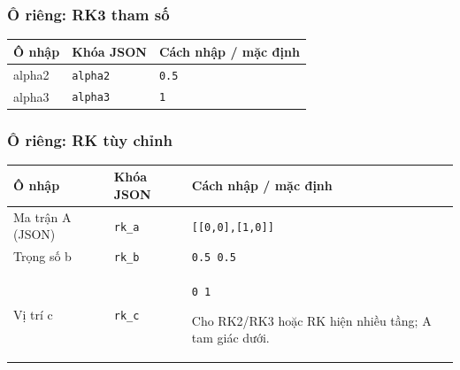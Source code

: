 \subsubsection*{Ô riêng: RK3 tham số}
\begin{center}\small\begin{tabular}{@{}p{.32\linewidth}p{.17\linewidth}p{.43\linewidth}@{}}\toprule
Ô nhập & Khóa JSON & Cách nhập / mặc định\\\midrule
alpha2 & \texttt{alpha2} & \texttt{0.5}\\[3pt]
alpha3 & \texttt{alpha3} & \texttt{1}\\[3pt]
\bottomrule\end{tabular}\end{center}
\subsubsection*{Ô riêng: RK tùy chỉnh}
\begin{center}\small\begin{tabular}{@{}p{.32\linewidth}p{.17\linewidth}p{.43\linewidth}@{}}\toprule
Ô nhập & Khóa JSON & Cách nhập / mặc định\\\midrule
Ma trận A (JSON) & \texttt{rk\_a} & \texttt{[[0,\allowbreak{}0],\allowbreak{}[1,\allowbreak{}0]]}\\[3pt]
Trọng số b & \texttt{rk\_b} & \texttt{0.5 0.5}\\[3pt]
Vị trí c & \texttt{rk\_c} & \texttt{0 1}
\par Cho RK2/\allowbreak{}RK3 hoặc RK hiện nhiều tầng;\allowbreak{} A tam giác dưới.\\[3pt]
\bottomrule\end{tabular}\end{center}
